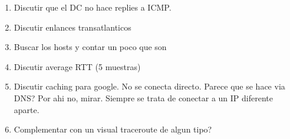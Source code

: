 \begin{enumerate}
	\item Discutir que el DC no hace replies a ICMP.
	\item Discutir enlances transatlanticos
	\item Buscar los hosts y contar un poco que son
	\item Discutir average RTT (5 muestras)
	\item Discutir caching para google. No se conecta directo. Parece que se hace via DNS? Por ahi no, mirar. Siempre se trata de conectar a un IP diferente aparte.
	\item Complementar con un visual traceroute de algun tipo?
\end{enumerate}